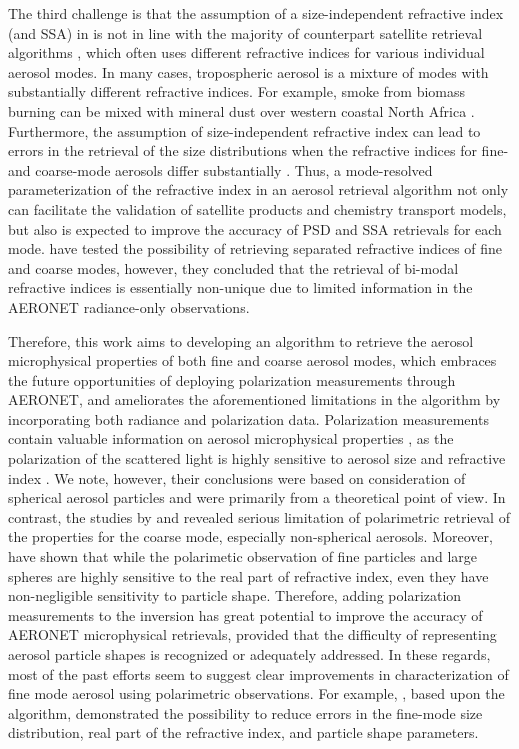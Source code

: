 The third challenge is that the assumption of a size-independent refractive
index (and SSA) in \Dub is not in line with the majority of counterpart
satellite retrieval algorithms \citep[e.g.,][]{Mishchenko07, Hasekamp11,
Martonchik09}, which often uses different refractive indices
for various individual aerosol modes. In many cases, tropospheric aerosol is a
mixture of modes with substantially different refractive indices. For example,
smoke from biomass burning can be mixed with mineral dust over western coastal
North Africa \citep{Yang13}. Furthermore, the assumption of
size-independent refractive index can lead to errors in the retrieval of the
size distributions when the refractive indices for fine- and coarse-mode
aerosols differ substantially \citep{Dubovik00b, Chowdhary01}.
Thus, a mode-resolved parameterization of the refractive index in an aerosol
retrieval algorithm not only can facilitate the validation of satellite
products and chemistry transport models, but also is expected to improve the
accuracy of PSD and SSA retrievals for each mode. \citep{Dubovik00b} have
tested the possibility of retrieving separated refractive indices of fine and
coarse modes, however, they concluded that the retrieval of bi-modal refractive
indices is essentially non-unique due to limited information in the AERONET
radiance-only observations. 

Therefore, this work aims to developing an algorithm to retrieve the aerosol
microphysical properties of both fine and coarse aerosol modes,
which embraces the future opportunities of
deploying polarization measurements through AERONET, and ameliorates the
aforementioned limitations in the \Dub algorithm by incorporating both
radiance and polarization data. Polarization measurements contain valuable
information on aerosol microphysical properties \citep{Mishchenko97},
as the polarization of the scattered light is highly sensitive to aerosol size
and refractive index \citep{Hansen74, Mishchenko02}. We note, however, their
conclusions were based on consideration of
spherical aerosol particles and were primarily from a theoretical point of
view. In contrast, the studies by \citet{Dubovik06} and \citet{Deuze93,
Deuze01} revealed serious limitation of polarimetric retrieval of the properties
for the coarse mode, especially non-spherical aerosols. Moreover, \citet{Dubovik06}
have shown that while the polarimetic observation of fine particles and large
spheres are highly sensitive to the real part of refractive index, even they have
non-negligible sensitivity to particle shape. Therefore, adding polarization
measurements to the inversion has great potential to improve the accuracy of
AERONET microphysical retrievals, provided that the difficulty of representing
aerosol particle shapes is recognized or adequately addressed. In these
regards, most of the past efforts seem to suggest clear improvements in
characterization of fine mode aerosol using polarimetric observations. For
example, \citet{Li09}, based upon the \Dub algorithm, demonstrated
the possibility to reduce errors in the fine-mode size distribution, real part
of the refractive index, and particle shape parameters. 

